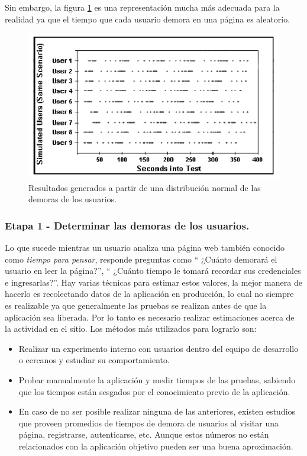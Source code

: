 Sin embargo, la figura \ref{fig.res_demora_distr_normal} es una representación mucha más adecuada para la realidad ya que el tiempo que cada usuario demora en una
página es aleatorio.
\begin{figure}[h]
\centering
\includegraphics[width=1\textwidth]{figuras/libro_azul/resultados_tiempos_distr_normal.png}
  \caption{Resultados generados a partir de una distribución normal de las demoras de los usuarios.}
  \label{fig.res_demora_distr_normal}
\end{figure}

\subsubsection{Etapa 1 - Determinar las demoras de los usuarios.}
Lo que sucede mientras un usuario analiza una página web también conocido como \emph{tiempo para pensar}, responde preguntas como `` ¿Cuánto demorará el usuario en leer
la página?'', `` ¿Cuánto tiempo le tomará recordar sus credenciales e ingresarlas?''. Hay varias técnicas para estimar estos valores, la mejor manera de hacerlo es recolectando datos de
la aplicación en producción, lo cual no siempre es realizable ya que generalmente las pruebas se realizan antes de que la aplicación sea liberada. Por lo tanto es necesario realizar
estimaciones acerca de la actividad en el sitio.
Los métodos más utilizados para lograrlo son:
\begin{itemize}
	\item
	Realizar un experimento interno con usuarios dentro del equipo de desarrollo o cercanos y estudiar su comportamiento.
	\item
	Probar manualmente la aplicación y medir tiempos de las pruebas, sabiendo que los tiempos están sesgados por el conocimiento previo de la aplicación.
	\item
	En caso de no ser posible realizar ninguna de las anteriores, existen estudios que proveen promedios de tiempos de demora de usuarios al visitar una página, registrarse,
	autenticarse, etc.	Aunque estos números no están relacionados con la aplicación objetivo pueden ser una buena aproximación.
\end{itemize}

